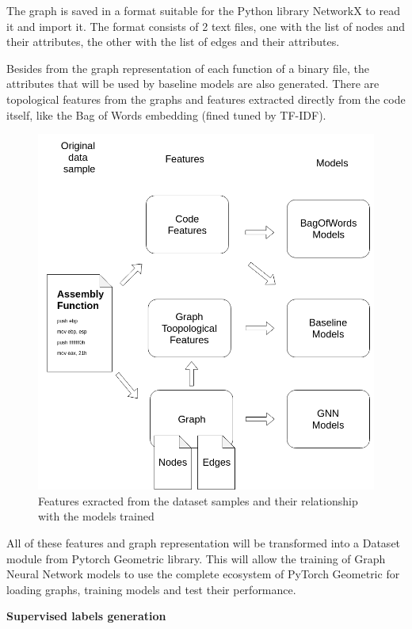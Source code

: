The graph is saved in a format suitable for the Python library NetworkX to read it and import it. The format consists of 2 text files, one with the list of nodes and their attributes, the other with the list of edges and their attributes.


Besides from the graph representation of each function of a binary file, the attributes that will be used by baseline models are also generated. There are topological features from the graphs and features extracted directly from the code itself, like the Bag of Words embedding (fined tuned by TF-IDF).




\begin{figure}[H]
    \centering
        \includegraphics[width=0.55\linewidth]{img/Features_and_models_diagram.png}
    \caption{Features exracted from the dataset samples and their relationship with the models trained}\label{fig:Features_diagram}
\end{figure}

All of these features and graph representation will be transformed into a Dataset module from Pytorch Geometric library. This will allow the training of Graph Neural Network models to use the complete ecosystem of PyTorch Geometric for loading graphs, training models and test their performance.




\textbf{Supervised labels generation}


